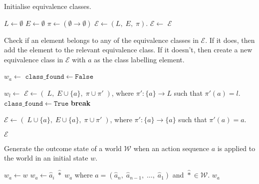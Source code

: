\begin{algorithm}[H]
	\caption{Initialise equivalence classes.}
	\hrulefill
	\begin{algorithmic}[1]
		\State $L \gets \emptyset$
		\State $E \gets \emptyset$
		\State $\pi \gets (\emptyset \to \emptyset)$
		\State $\mathcal{E} \gets (L, \; E, \; \pi)$.
		\State $\mathcal{E} \gets$ 
		\EndFor
		\State \Return $\mathcal{E}$
		\EndProcedure
	\end{algorithmic}
\end{algorithm}


\begin{algorithm}[H]
	\caption{
		Check if an element belongs to any of the equivalence classes in $\mathcal{E}$.
		If it does, then add the element to the relevant equivalence class.
		If it doesn't, then create a new equivalence class in $\mathcal{E}$ with $a$ as the class labelling element.
	}
	\hrulefill
	\begin{algorithmic}[1]
		\State $w_{a} \gets$ 
		\State $\texttt{class$\_$found} \gets \texttt{False}$

		\State $w_{l} \gets$ 
		\Statex {}
		\State $\mathcal{E} \gets (\; L, \; E \cup \{a\}, \; \pi \cup \pi' \;)$, where $\pi': \{a\} \to L$ such that $\pi'(a) = l$.
		\State $\texttt{class$\_$found} \gets \texttt{True}$
		\State \textbf{break}
		\EndIf
		\EndFor

		\Statex {}
		\State $\mathcal{E} \gets (\; L \cup \{a\}, \; E \cup \{a\}, \; \pi \cup \pi' \;)$, where $\pi': \{a\} \to \{a\}$ such that $\pi'(a) = a$.
		\EndIf

		\State \Return $\mathcal{E}$
		\EndProcedure
	\end{algorithmic}
\end{algorithm}


\begin{algorithm}[H]
	\caption{
		Generate the outcome state of a world $\mathscr{W}$ when an action sequence $a$ is applied to the world in an initial state $w$.
	}
	\label{alg:GenerateActionOutcome2}
	\hrulefill
	\begin{algorithmic}[1]
		\State $w_{a} \gets w$
		\State $w_{a} \gets \hat{a}_{i} \; \hat{\ast} \; w_{a}$ where $a = (\hat{a}_n, \; \hat{a}_{n-1}, \; \dots, \; \hat{a}_1)$ and $\hat{\ast} \in \mathscr{W}$.
		\EndFor
		\State \Return $w_{a}$
		\EndProcedure
	\end{algorithmic}
\end{algorithm}


